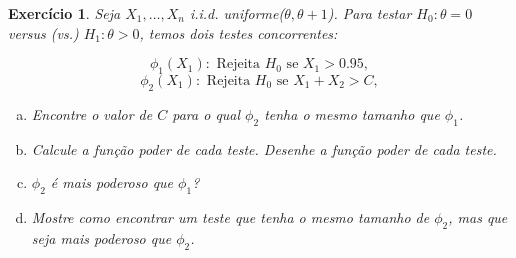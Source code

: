 \documentclass[letter,11pt]{article}
\newtheorem{exer}{Exercício}
\begin{document}
% 
% 
% 
% 
% 
% 

\begin{exer} \rm 
 Seja $X_1,\ldots,X_n$  i.i.d. uniforme($\theta,\theta+1$). Para testar $H_0:\theta =0$ versus (vs.) $H_1:\theta > 0$, temos dois testes concorrentes:

 $$\phi_1(X_1): \mbox{ Rejeita } H_0 \mbox{ se } X_1> 0.95,$$
 $$\phi_2(X_1): \mbox{ Rejeita } H_0 \mbox{ se } X_1+X_2> C,$$

\begin{enumerate}[a)]
\item Encontre o valor de $C$ para o qual $\phi_2$ tenha o mesmo tamanho  que $\phi_1$.

\item    Calcule a função poder de cada teste. Desenhe a função poder de cada teste.

\item $\phi_2$ é mais poderoso que $\phi_1$?

\item Mostre como encontrar um teste que tenha o mesmo tamanho de $\phi_2$, mas que seja mais poderoso que $\phi_2$.
\end{enumerate}
\end{exer}
\end{document}
